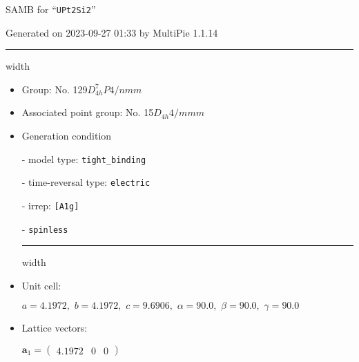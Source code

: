 \documentclass[fleqn,10pt,landscape]{article}
\begin{document}
\setcounter{MaxMatrixCols}{16}

\setlength{\baselineskip}{16pt}
\footnotesize
\begin{center}
\LARGE
SAMB for ``\texttt{UPt2Si2}''
\end{center}
\begin{flushright}
Generated on 2023-09-27 01:33 by MultiPie 1.1.14
\end{flushright}
\vspace{1cm}


 \hfil \hrule height 1mm width \textwidth \hfil

\begin{itemize}
\item Group: No. 129\quad$D_{4h}^{7}$\quad$P4/nmm$\quad[ tetragonal ]

\item Associated point group: No. 15\quad$D_{4h}$\quad$4/mmm$\quad[ tetragonal ]

\vspace{5mm}

\item Generation condition

\quad - model type: \texttt{tight_binding}

\quad - time-reversal type: \texttt{electric}

\quad - irrep: \texttt{[A1g]}

\quad - \texttt{spinless}


 \hfil \hrule height 1mm width \textwidth \hfil

\item Unit cell:

\quad $a=4.1972,\,\, b=4.1972,\,\, c=9.6906,\,\, \alpha=90.0,\,\, \beta=90.0,\,\, \gamma=90.0$

\item Lattice vectors:

\quad $\bm{a}_1=\begin{pmatrix} 4.1972 & 0 & 0 \end{pmatrix}$


\end{itemize}
\end{document}
